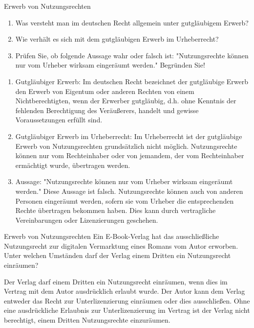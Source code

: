 \documentclass{article}
\begin{document}
\begin{exercise}{Erwerb von Nutzungsrechten}
  \begin{enumerate}
    \item Was versteht man im deutschen Recht allgemein unter gutgläubigem Erwerb?
    \item Wie verhält es sich mit dem gutgläubigen Erwerb im Urheberrecht?
    \item Prüfen Sie, ob folgende Aussage wahr oder falsch ist: "Nutzungsrechte können nur vom Urheber wirksam eingeräumt werden." Begründen Sie!
  \end{enumerate}

  \begin{solution}
    \begin{enumerate}
      \item Gutgläubiger Erwerb: Im deutschen Recht bezeichnet der gutgläubige Erwerb den Erwerb von Eigentum oder anderen Rechten von einem Nichtberechtigten, wenn der Erwerber gutgläubig, d.h. ohne Kenntnis der fehlenden Berechtigung des Veräußerers, handelt und gewisse Voraussetzungen erfüllt sind.
      \item Gutgläubiger Erwerb im Urheberrecht: Im Urheberrecht ist der gutgläubige Erwerb von Nutzungsrechten grundsätzlich nicht möglich. Nutzungsrechte können nur vom Rechteinhaber oder von jemandem, der vom Rechteinhaber ermächtigt wurde, übertragen werden.
      \item Aussage: "Nutzungsrechte können nur vom Urheber wirksam eingeräumt werden." Diese Aussage ist falsch. Nutzungsrechte können auch von anderen Personen eingeräumt werden, sofern sie vom Urheber die entsprechenden Rechte übertragen bekommen haben. Dies kann durch vertragliche Vereinbarungen oder Lizenzierungen geschehen.
    \end{enumerate}
  \end{solution}
\end{exercise}

\begin{exercise}{Erwerb von Nutzungsrechten}
  Ein E-Book-Verlag hat das ausschließliche Nutzungsrecht zur digitalen Vermarktung eines Romans vom Autor erworben. Unter welchen Umständen darf der Verlag einem Dritten ein Nutzungsrecht einräumen?

  \begin{solution}
    Der Verlag darf einem Dritten ein Nutzungsrecht einräumen, wenn dies im Vertrag mit dem Autor ausdrücklich erlaubt wurde. Der Autor kann dem Verlag entweder das Recht zur Unterlizenzierung einräumen oder dies ausschließen. Ohne eine ausdrückliche Erlaubnis zur Unterlizenzierung im Vertrag ist der Verlag nicht berechtigt, einem Dritten Nutzungsrechte einzuräumen.
  \end{solution}
\end{exercise}
\end{document}
